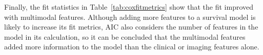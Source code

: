 
Finally, the fit statistics in Table~\ref{tab:coxfitmetrics} show that the fit improved with multimodal features.
Although adding more features to a survival model is likely to increase its fit metrics, AIC also considers the number of features in the model in its calculation, so it can be concluded that the multimodal features added more information to the model than the clinical or imaging features alone.

